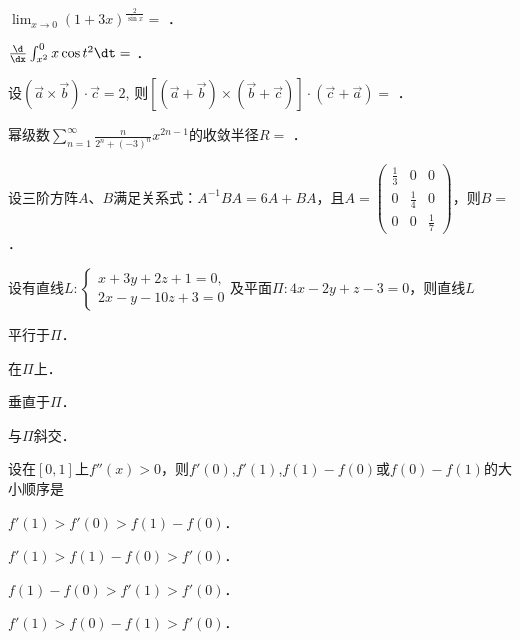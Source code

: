 \documentclass[plain,noanswer,medmath]{../../template/jnuexam}
\begin{document}




\begin{problem}
$\lim_{x \to 0} (1 + 3x)^{\frac{2}{\sin x}} =$ \fillin{}．
\end{problem}


\begin{problem}
$\frac{\d}{\dx}\int_{x^2}^0x\cos t^2 \dt =$ \fillin{}．
\end{problem}


\begin{problem}
设$(\vec{a}\times \vec{b}) \cdot \vec{c}= 2$,
则$[(\vec{a}+ \vec{b}) \times(\vec{b}+ \vec{c})] \cdot (\vec{c}+ \vec{a}) =$ \fillin{}．
\end{problem}


\begin{problem}
幂级数$\sum_{n = 1}^{\infty}\frac{n}{2^n + (- 3)^n}x^{2n - 1}$的收敛半径$R =$ \fillin{}．
\end{problem}


\begin{problem}
设三阶方阵$A$、$B$满足关系式：$A^{-1} BA = 6A + BA$，且$A = \begin{pmatrix}
  \frac{1}{3} &           0 & 0 \\
            0 & \frac{1}{4} & 0 \\
            0 &           0 & \frac{1}{7}
\end{pmatrix}$，则$B =$ \fillin{}．
\end{problem}




\begin{problem}
设有直线$L:\begin{cases}
  x + 3y + 2z + 1 = 0, \\
  2x - y - 10z + 3 = 0
\end{cases}$及平面$\Pi :4x - 2y + z - 3 = 0$，则直线$L$\pickout{}
\begin{abcd}
\item 平行于$\Pi$．   
\item 在$\Pi$上．   
\item 垂直于$\Pi$．   
\item 与$\Pi$斜交．
\end{abcd}
\end{problem}


\begin{problem}
设在$[0,1]$上$f''(x) > 0$，则$f'(0)$,$f'(1)$,$f(1) - f(0)$或$f(0) - f(1)$的大小顺序是\pickout{}
\begin{abcd}
\item $f'(1) > f'(0) > f(1) - f(0)$．       
\item $f'(1) > f(1) - f(0) > f'(0)$．
\item $f(1) - f(0) > f'(1) > f'(0)$．       
\item $f'(1) > f(0) - f(1) > f'(0)$．
\end{abcd}
\end{problem}
\end{document}
